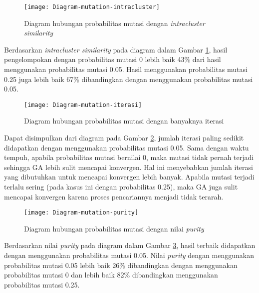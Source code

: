 \begin{enumerate}
		\begin{figure}[H]
			\centering
			\texttt{[image: Diagram-mutation-intracluster]}
			\caption{Diagram hubungan probabilitas mutasi dengan \textit{intracluster similarity}}
			\label{fig:graph:mutation-intra}
		\end{figure}
		
		Berdasarkan \textit{intracluster similarity} pada diagram dalam Gambar  \ref{fig:graph:mutation-intra}, hasil pengelompokan dengan probabilitas mutasi 0 lebih baik 43\% dari hasil menggunakan probabilitas mutasi 0.05. Hasil menggunakan probabilitas mutasi 0.25 juga lebih baik 67\% dibandingkan dengan menggunakan probabilitas mutasi 0.05.
		
		\begin{figure}[H]
			\centering
			\texttt{[image: Diagram-mutation-iterasi]}
			\caption{Diagram hubungan probabilitas mutasi dengan banyaknya iterasi}
			\label{fig:graph:mutation-iteration}
		\end{figure}
		
		Dapat disimpulkan dari diagram pada Gambar \ref{fig:graph:mutation-iteration}, jumlah iterasi paling sedikit didapatkan dengan menggunakan probabilitas mutasi 0.05. Sama dengan waktu tempuh, apabila probabilitas mutasi bernilai 0, maka mutasi tidak pernah terjadi sehingga GA lebih sulit mencapai konvergen. Hal ini menyebabkan jumlah iterasi yang dibutuhkan untuk mencapai konvergen lebih banyak. Apabila mutasi terjadi terlalu sering (pada kasus ini dengan probabilitas 0.25), maka GA juga sulit mencapai konvergen karena proses pencariannya menjadi tidak terarah.
		
		\begin{figure}[H]
			\centering
			\texttt{[image: Diagram-mutation-purity]}
			\caption{Diagram hubungan probabilitas mutasi dengan nilai \textit{purity}}
			\label{fig:graph:mutation-purity}
		\end{figure}
		
		Berdasarkan nilai \textit{purity} pada diagram dalam Gambar \ref{fig:graph:mutation-purity}, hasil terbaik didapatkan dengan menggunakan probabilitas mutasi 0.05. Nilai \textit{purity} dengan menggunakan probabilitas mutasi 0.05 lebih baik 26\% dibandingkan dengan menggunakan probabilitas mutasi 0 dan lebih baik 82\% dibandingkan menggunakan probabilitas mutasi 0.25.
		

\end{enumerate}
